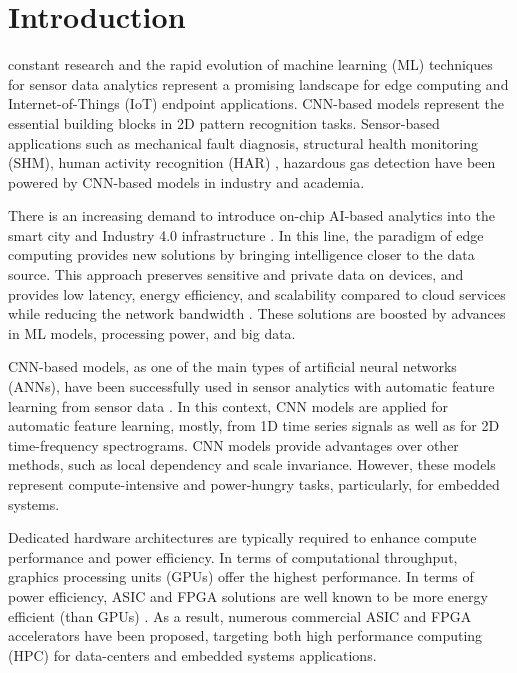
\section{Introduction}
\label{sec:introduction}

 constant research and the rapid evolution of machine learning (ML) techniques for sensor data analytics represent a promising landscape for edge computing and Internet-of-Things (IoT) endpoint applications. CNN-based models represent the essential building blocks in 2D pattern recognition tasks. Sensor-based applications such as mechanical fault diagnosis\cite{li2019sensor,dong2018rolling}, structural health monitoring (SHM)\cite{nagayama2007structural}, human activity recognition (HAR) \cite{wang2019deep}, hazardous gas detection\cite{kim2017hazardous} have been powered by CNN-based models in industry and academia.

There is an increasing demand to introduce on-chip AI-based analytics into the smart city and Industry 4.0 infrastructure \cite{lom2016industry}. In this line, the paradigm of edge computing provides new solutions by bringing intelligence closer to the data source. This approach preserves sensitive and private data on devices, and provides low latency, energy efficiency, and scalability compared to cloud services while reducing the network bandwidth \cite{chen2019deep}. These solutions are boosted by advances in ML models, processing power, and big data.

CNN-based models, as one of the main types of artificial neural networks (ANNs),
have been successfully used in sensor analytics with automatic feature learning from sensor data \cite{ince2016real, janssens2016convolutional, abdeljaber2017real, guo2016hierarchical}. In this context, CNN models are applied for automatic feature learning, mostly, from 1D time series signals as well as for 2D time-frequency spectrograms. CNN models provide advantages over other methods, such as local dependency and scale invariance. However, these models represent compute-intensive and power-hungry tasks, particularly, for embedded systems.

Dedicated hardware architectures are typically required to enhance compute performance and power efficiency. In terms of computational throughput, graphics processing units (GPUs) offer the highest performance. In terms of power efficiency, ASIC and FPGA solutions are well known to be more energy efficient (than GPUs) \cite{nurvitadhi2017can}. As a result, numerous commercial ASIC and FPGA accelerators have been proposed, targeting both high performance computing (HPC) for data-centers and embedded systems applications.

